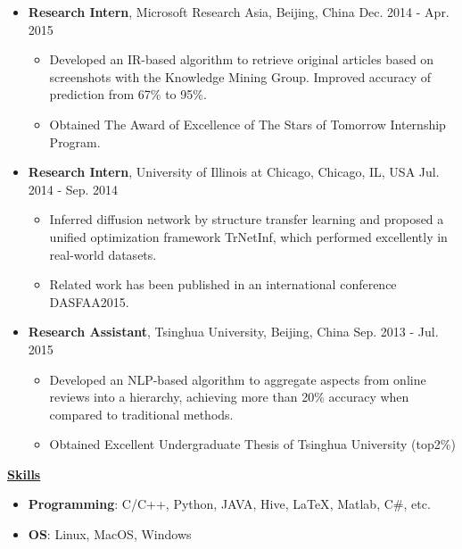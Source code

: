 \documentclass[11pt]{article}
\begin{document}
\begin{CJK}{GBK}{kai}
\begin{itemize}
   \item \textbf{Research Intern}, Microsoft Research Asia, Beijing, China \hfill Dec. 2014 - Apr. 2015\\
     \begin{itemize}
     \item Developed an IR-based algorithm to retrieve original articles based on screenshots with the Knowledge Mining Group. Improved accuracy of prediction from 67\% to 95\%.
     \item Obtained The Award of Excellence of The Stars of Tomorrow Internship Program.\\\medskip
     \end{itemize}

   \item \textbf{Research Intern}, University of Illinois at Chicago, Chicago, IL, USA \hfill Jul. 2014 - Sep. 2014\\
     \begin{itemize}
     \item Inferred diffusion network  by structure transfer learning and proposed a unified optimization framework TrNetInf, which performed excellently in real-world datasets.
     \item Related work has been published in an international conference DASFAA2015. \\\medskip
     \end{itemize}
  
   \item \textbf{Research Assistant}, Tsinghua University, Beijing, China \hfill Sep. 2013 - Jul. 2015\\
     \begin{itemize}
     \item Developed an NLP-based algorithm to aggregate aspects from online reviews into a hierarchy, achieving more than 20\% accuracy when compared to traditional methods. 
     \item Obtained Excellent Undergraduate Thesis of Tsinghua University (top2\%)
     \end{itemize}
\end{itemize}

\bigskip

{ \textbf{\underline{Skills}}}
\begin{itemize}
    \item \textbf{Programming}: C/C++, Python, JAVA, Hive, {\LaTeX},  Matlab, C\#, etc.%
    \item \textbf{OS}: Linux, MacOS, Windows
\end{itemize}

\end{CJK}
\end{document}
